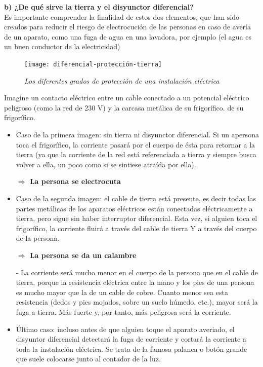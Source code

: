 \documentclass[a5paper,twoside,openany]{book}
\newenvironment{normalize}{\leftskip-\leftmargin}{\par}
\begin{document}
\newpage
\textbf{b) ¿De qué sirve la tierra y el disyunctor diferencial?}\\
Es importante comprender la finalidad de estos dos elementos, que han sido
creados para reducir el riesgo de electrocución de las personas en caso de avería de un aparato, como una fuga de agua en una lavadora, por ejemplo (el agua es un buen conductor de la electricidad)

\begin{figure}[h]
\texttt{[image: diferencial-protección-tierra]} 
\centering
\caption*{\textit{Los diferentes grados de protección de una instalación eléctrica}}
\end{figure}

Imagine un contacto eléctrico entre un cable conectado a un potencial eléctrico peligroso
(como la red de 230 V) y la carcasa metálica de su frigorífico.
de su frigorífico.

\begin{itemize}
\item Caso de la primera imagen: sin tierra ni disyunctor diferencial.
Si un apersona toca el frigorífico, la corriente pasará por el cuerpo de ésta para retornar a la tierra (ya que la corriente de la red está referenciada a tierra y siempre busca volver a ella, un poco como si se sintiese atraída por ella).

\textbf{$\Rightarrow$ La persona se electrocuta}

\item Caso de la segunda imagen: el cable de tierra está presente, es decir
todas las partes metálicas de los aparatos eléctricos están conectadas eléctricamente a tierra, pero sigue sin haber interruptor diferencial.
Esta vez, si alguien toca el frigorífico, la corriente fluirá a través del cable de tierra Y a través del cuerpo de la persona.

\textbf{$\Rightarrow$ La persona se da un calambre}
\newpage

\begin{normalize}
La corriente será mucho menor en el cuerpo de la persona que en el cable de tierra, porque la resistencia eléctrica entre la mano y los pies de una persona es mucho mayor que la de un cable de cobre. Cuanto menor sea esta resistencia (dedos y pies mojados, sobre un suelo húmedo, etc.), mayor será la fuga a tierra. Más fuerte y, por tanto, más peligrosa será la corriente.
\end{normalize}

\item Último caso: incluso antes de que alguien toque el aparato averiado, el disyuntor diferencial detectará la fuga de corriente y cortará la corriente a toda la instalación eléctrica. Se trata de la famosa palanca o botón grande que suele colocarse junto al contador de la luz.

\end{itemize}
\end{document}
